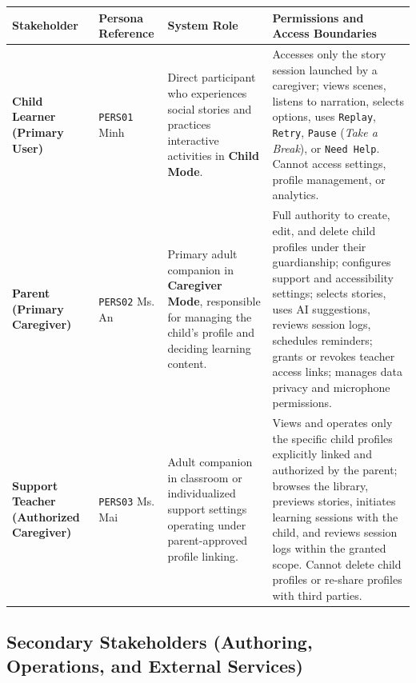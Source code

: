 \noindent\begin{xltabular}{\textwidth}{|p{2.0cm}|p{3.2cm}|X|p{2.8cm}|}
\hline
\textbf{Stakeholder} & \textbf{Persona Reference} & \textbf{System Role} & \textbf{Permissions and Access Boundaries} \\ \hline
\endhead
\textbf{Child Learner (Primary User)} & \texttt{PERS01} Minh & Direct participant who experiences social stories and practices interactive activities in \textbf{Child Mode}. & Accesses only the story session launched by a caregiver; views scenes, listens to narration, selects options, uses \texttt{Replay}, \texttt{Retry}, \texttt{Pause} (\textit{Take a Break}), or \texttt{Need Help}. Cannot access settings, profile management, or analytics. \\ \hline
\textbf{Parent (Primary Caregiver)} & \texttt{PERS02} Ms. An & Primary adult companion in \textbf{Caregiver Mode}, responsible for managing the child's profile and deciding learning content. & Full authority to create, edit, and delete child profiles under their guardianship; configures support and accessibility settings; selects stories, uses AI suggestions, reviews session logs, schedules reminders; grants or revokes teacher access links; manages data privacy and microphone permissions. \\ \hline
\textbf{Support Teacher (Authorized Caregiver)} & \texttt{PERS03} Ms. Mai & Adult companion in classroom or individualized support settings operating under parent-approved profile linking. & Views and operates only the specific child profiles explicitly linked and authorized by the parent; browses the library, previews stories, initiates learning sessions with the child, and reviews session logs within the granted scope. Cannot delete child profiles or re-share profiles with third parties. \\ \hline
\end{xltabular}



\subsection{Secondary Stakeholders (Authoring, Operations, and External Services)}


